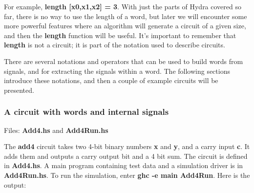 \documentclass[11pt]{article}
\begin{document}
For example, \textbf{length [x0,x1,x2] = 3}.  With just the parts of Hydra
covered so far, there is no way to use the length of a word, but later
we will encounter some more powerful features where an algorithm will
generate a circuit of a given size, and then the \textbf{length} function
will be useful.  It's important to remember that \textbf{length} is not a
circuit; it is part of the notation used to describe circuits.

There are several notations and operators that can be used to build
words from signals, and for extracting the signals within a word.  The
following sections introduce these notations, and then a couple of
example circuits will be presented.

\subsubsection{A circuit with words and internal signals}
\label{sec:org65e0647}

Files: \textbf{Add4.hs} and \textbf{Add4Run.hs}

The \textbf{add4} circuit takes two 4-bit binary numbers \textbf{x} and \textbf{y}, and a
carry input \textbf{c}.  It adds them and outputs a carry output bit and a 4
bit sum.  The circuit is defined in \textbf{Add4.hs}.  A main program
containing test data and a simulation driver is in \textbf{Add4Run.hs}.  To
run the simulation, enter \textbf{ghc -e main Add4Run}.  Here is the output:
\end{document}
